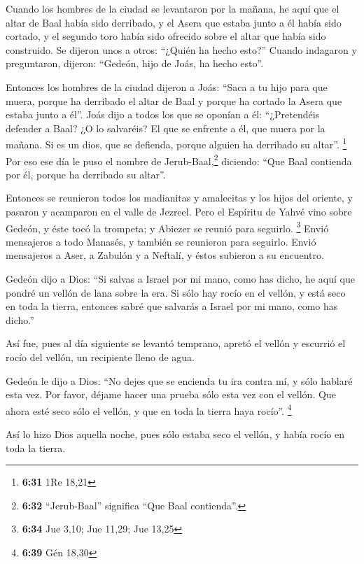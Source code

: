  Cuando los hombres de la ciudad se levantaron por la
mañana, he aquí que el altar de Baal había sido derribado, y el Asera
que estaba junto a él había sido cortado, y el segundo toro había sido
ofrecido sobre el altar que había sido construido.  Se
dijeron unos a otros: ``¿Quién ha hecho esto?'' Cuando indagaron y
preguntaron, dijeron: ``Gedeón, hijo de Joás, ha hecho esto''.

 Entonces los hombres de la ciudad dijeron a Joás: ``Saca
a tu hijo para que muera, porque ha derribado el altar de Baal y porque
ha cortado la Asera que estaba junto a él''.  Joás dijo a
todos los que se oponían a él: ``¿Pretendéis defender a Baal? ¿O lo
salvaréis? El que se enfrente a él, que muera por la mañana. Si es un
dios, que se defienda, porque alguien ha derribado su altar''.
\footnote{\textbf{6:31} 1Re 18,21}  Por eso ese día le
puso el nombre de Jerub-Baal,\footnote{\textbf{6:32} ``Jerub-Baal''
  significa ``Que Baal contienda''.} diciendo: ``Que Baal contienda por
él, porque ha derribado su altar''.

 Entonces se reunieron todos los madianitas y amalecitas
y los hijos del oriente, y pasaron y acamparon en el valle de Jezreel.
 Pero el Espíritu de Yahvé vino sobre Gedeón, y éste tocó
la trompeta; y Abiezer se reunió para seguirlo. \footnote{\textbf{6:34}
  Jue 3,10; Jue 11,29; Jue 13,25}  Envió mensajeros a
todo Manasés, y también se reunieron para seguirlo. Envió mensajeros a
Aser, a Zabulón y a Neftalí, y éstos subieron a su encuentro.

 Gedeón dijo a Dios: ``Si salvas a Israel por mi mano,
como has dicho,  he aquí que pondré un vellón de lana
sobre la era. Si sólo hay rocío en el vellón, y está seco en toda la
tierra, entonces sabré que salvarás a Israel por mi mano, como has
dicho.''

 Así fue, pues al día siguiente se levantó temprano,
apretó el vellón y escurrió el rocío del vellón, un recipiente lleno de
agua.

 Gedeón le dijo a Dios: ``No dejes que se encienda tu ira
contra mí, y sólo hablaré esta vez. Por favor, déjame hacer una prueba
sólo esta vez con el vellón. Que ahora esté seco sólo el vellón, y que
en toda la tierra haya rocío''. \footnote{\textbf{6:39} Gén 18,30}

 Así lo hizo Dios aquella noche, pues sólo estaba seco el
vellón, y había rocío en toda la tierra.

